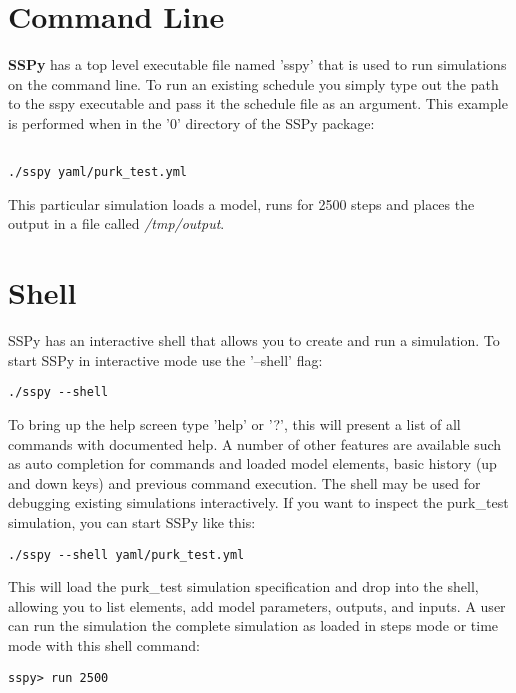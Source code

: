 \documentclass[12pt]{article}
\begin{document}
\section*{Command Line}

	{\bf SSPy} has a top level executable file named 'sspy' that is used to run simulations on the command line. To run an existing schedule you simply type out the path to the sspy executable and pass it the schedule file as an argument. This example is performed when in the '0' directory of the SSPy package:
	
\begin{verbatim}

./sspy yaml/purk_test.yml

\end{verbatim}

This particular simulation loads a model, runs for 2500 steps and places the output in a file called {\it /tmp/output}.

\section*{Shell}

	SSPy has an interactive shell that allows you to create and run a simulation.  To start SSPy in interactive mode use the '--shell' flag:
	

\begin{verbatim}
./sspy --shell
\end{verbatim}


To bring up the help screen type 'help' or '?', this will present a list of all commands with documented help. A number of other features are available such as auto completion for commands and loaded model elements, basic history (up and down keys) and previous command execution. The shell may be used for debugging existing simulations interactively. If you want to inspect the purk\_test simulation, you can start SSPy like this:


\begin{verbatim}
./sspy --shell yaml/purk_test.yml
\end{verbatim}


This will load the purk\_test simulation specification and drop into the shell, allowing you to list elements, add model parameters, outputs, and inputs. A user can run the simulation the complete simulation as loaded in steps mode or time mode with this shell command:

\begin{verbatim}
sspy> run 2500
\end{verbatim}
\end{document}
